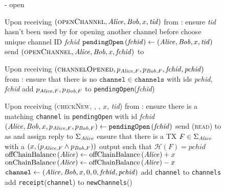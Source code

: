 \begin{figure}[!htbp]
  \begin{systembox}{\fpaynet - open}
    \begin{algorithmic}[1]
      \State Upon receiving $\left(\textsc{openChannel}, \mathit{Alice}, \mathit{Bob}, x,
      \mathit{tid}\right)$ from \alice:
      \Indent
        \State ensure \textit{tid} hasn't been used by \alice{} for opening
        another channel before
        \State choose unique channel ID \textit{fchid}
        \State $\mathtt{pendingOpen}\left(\mathit{fchid}\right) \gets
        \left(\mathit{Alice}, \mathit{Bob}, x, \mathit{tid}\right)$
        \State send $\left(\textsc{openChannel}, \mathit{Alice}, \mathit{Bob}, x,
        \mathit{fchid}\right)$ to \simulator
      \EndIndent
      \State

      \State Upon receiving $\left(\textsc{channelOpened}, p_{\mathit{Alice}, F},
      p_{\mathit{Bob}, F}, \mathit{fchid}, \mathit{pchid}\right)$ from \simulator:
      \Indent
        \State ensure that there is no $\mathtt{channel} \in \mathtt{channels}$
        with ids \textit{pchid}, \textit{fchid}
        \State add $p_{\mathit{Alice}, F}, p_{\mathit{Bob}, F}$ to
        \texttt{pendingOpen}(\textit{fchid})
      \EndIndent
      \State

      \State Upon receiving (\textsc{checkNew}, \alice, \bob, $x$, \textit{tid})
      from \alice:
      \Indent
        \State ensure there is a matching \texttt{channel} in
        \texttt{pendingOpen} with id \textit{fchid}
        \State $\left(\mathit{Alice}, \mathit{Bob}, x, p_{\mathit{Alice}, F}, p_{\mathit{Bob}, F}\right) \gets
        \mathtt{pendingOpen}\left(\mathit{fchid}\right)$
        \State send (\textsc{read}) to \ledger{} as \alice{} and assign reply to
        $\Sigma_{\mathit{Alice}}$
        \State ensure that there is a TX $F \in \Sigma_{\mathit{Alice}}$ with a
        $\left(x, \left(p_{\mathit{Alice}, F} \wedge p_{\mathit{Bob}, F}\right)\right)$ output
        such that $\mathcal{H}\left(F\right) = \mathit{pchid}$
        \State $\mathrm{offChainBalance}\left(\mathit{Alice}\right) \gets
        \mathrm{offChainBalance}\left(\mathit{Alice}\right) + x$ 
        \State $\mathrm{onChainBalance}\left(\mathit{Alice}\right) \gets
        \mathrm{offChainBalance}\left(\mathit{Alice}\right) - x$
        \State $\mathtt{channel} \gets \left(\mathit{Alice}, \mathit{Bob}, x, 0, 0,
        \mathit{fchid}, \mathit{pchid}\right)$
        \State add \texttt{channel} to \texttt{channels}
        \State add \texttt{receipt}(\texttt{channel}) to
        \texttt{newChannels}(\alice)
      \EndIndent
    \end{algorithmic}
  \end{systembox}
  \caption{}
  \label{alg:fpaynet:open}
\end{figure}

